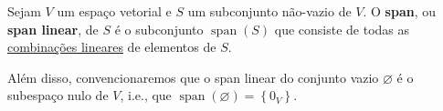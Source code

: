 \begin{definition}
	Sejam $V$ um espaço vetorial e $S$ um subconjunto não-vazio de $V$. O \textbf{span}, ou \textbf{span linear}, de $S$ é o subconjunto $\operatorname{span}(S)$ que consiste de todas as \href{http://mtm.ufsc.br/~cordeiro/ensino/mtm3112.algebra.linear/04.span/con_comb_lin_moodle.html}{combinações lineares} de elementos de $S$.
	
	Além disso, convencionaremos que o span linear do conjunto vazio $\varnothing$ é o subespaço nulo de $V$, i.e., que $\operatorname{span}(\varnothing)=\left\{0_V\right\}$.
\end{definition}
